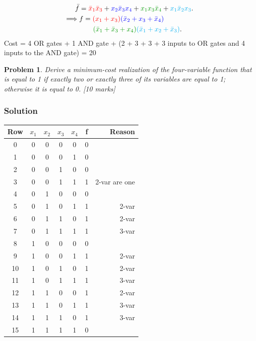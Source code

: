 \documentclass{article}
\newtheorem{prob}{Problem}
\newcommand{\bx}{\bar{x}}
\newcommand{\cred}{\color{red}}
\newcommand{\cg}{\color{green!60!black}}
\newcommand{\cb}{\color{blue}}
\begin{document}
\\
\begin{align}
  \bar{f} &= { \cred \bx_1 \bx_3 }  +  { \cb  x_2 \bx_3 x_4 }+  {\cg x_1 x_3 \bx_4
  } + { \color{cyan} x_1 \bx_2 x_3}.
  \\
  \implies &f = { \cred (x_1 + x_3) } {\cb (\bx_2 + x_3 + \bx_4) }
  \notag\\
  &\qquad {\cg (\bx_1 + \bx_3 + x_4) }
  {\color{cyan} (\bx_1 + x_2 + \bx_3 )}.
\end{align}
Cost = 4 OR gates + 1 AND gate + (2 + 3 + 3 + 3 inputs to OR gates and 4 inputs
to the AND gate) = 20 



\begin{prob}
Derive a minimum-cost realization of the four-variable function that is equal to 1 if exactly
two or exactly three of its variables are equal to 1; otherwise it is equal to
0. \cite[Prob 2.46]{brown2013fundamentals} [10 marks]
\end{prob}

\subsubsection*{Solution}

\begin{tabular}{c|cccc||c|r}
  \toprule
  Row & $x_1$  & $x_2$ & $x_3$ & $x_4$ & f & Reason\\
  \midrule
   0 & 0 & 0 &  0 & 0 & 0 & 
   \\
   1 & 0 & 0 &  0 & 1 & 0 &
   \\
   2 & 0 & 0 &  1 & 0 & 0 &
   \\
   3 & 0 & 0 &  1 & 1 & 1 & 2-var are one
   \\
   4 & 0 & 1 &  0 & 0 & 0 & 
   \\
   5 & 0 & 1 &  0 & 1 & 1 & 2-var
   \\
   6 & 0 & 1 &  1 & 0 & 1 & 2-var
   \\
   7 & 0 & 1 &  1 & 1 & 1 & 3-var
   \\
   8 & 1 & 0 &  0 & 0 & 0 & 
   \\
   9 & 1 & 0 &  0 & 1 & 1 & 2-var
  \\
  10 & 1 & 0 &  1 & 0 & 1 & 2-var
  \\
  11 & 1 & 0 &  1 & 1 & 1 & 3-var
  \\
  12 & 1 & 1 &  0 & 0 & 1 & 2-var
  \\
  13 & 1 & 1 &  0 & 1 & 1 & 3-var
  \\
  14 & 1 & 1 &  1 & 0 & 1 & 3-var
  \\
  15 & 1 & 1 &  1 & 1 & 0 &
  \\
  \bottomrule
\end{tabular}
\end{document}
